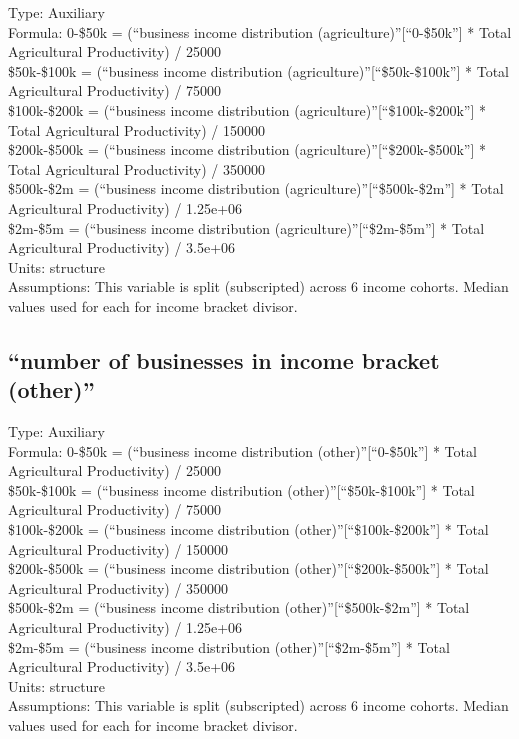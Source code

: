 \documentclass[
  11pt,
]{book}
\begin{document}
Type: Auxiliary\\
Formula: 0-\$50k = (``business income distribution (agriculture)''{[}``0-\$50k''{]} * Total Agricultural Productivity) / 25000\\
\$50k-\$100k = (``business income distribution (agriculture)''{[}``\$50k-\$100k''{]} * Total Agricultural Productivity) / 75000\\
\$100k-\$200k = (``business income distribution (agriculture)''{[}``\$100k-\$200k''{]} * Total Agricultural Productivity) / 150000\\
\$200k-\$500k = (``business income distribution (agriculture)''{[}``\$200k-\$500k''{]} * Total Agricultural Productivity) / 350000\\
\$500k-\$2m = (``business income distribution (agriculture)''{[}``\$500k-\$2m''{]} * Total Agricultural Productivity) / 1.25e+06\\
\$2m-\$5m = (``business income distribution (agriculture)''{[}``\$2m-\$5m''{]} * Total Agricultural Productivity) / 3.5e+06\\
Units: structure\\
Assumptions: This variable is split (subscripted) across 6 income cohorts. Median values used for each for income bracket divisor.

\hypertarget{number-of-businesses-in-income-bracket-other}{%
\subsection{``number of businesses in income bracket (other)''}\label{number-of-businesses-in-income-bracket-other}}

Type: Auxiliary\\
Formula: 0-\$50k = (``business income distribution (other)''{[}``0-\$50k''{]} * Total Agricultural Productivity) / 25000\\
\$50k-\$100k = (``business income distribution (other)''{[}``\$50k-\$100k''{]} * Total Agricultural Productivity) / 75000\\
\$100k-\$200k = (``business income distribution (other)''{[}``\$100k-\$200k''{]} * Total Agricultural Productivity) / 150000\\
\$200k-\$500k = (``business income distribution (other)''{[}``\$200k-\$500k''{]} * Total Agricultural Productivity) / 350000\\
\$500k-\$2m = (``business income distribution (other)''{[}``\$500k-\$2m''{]} * Total Agricultural Productivity) / 1.25e+06\\
\$2m-\$5m = (``business income distribution (other)''{[}``\$2m-\$5m''{]} * Total Agricultural Productivity) / 3.5e+06\\
Units: structure\\
Assumptions: This variable is split (subscripted) across 6 income cohorts. Median values used for each for income bracket divisor.
\end{document}
